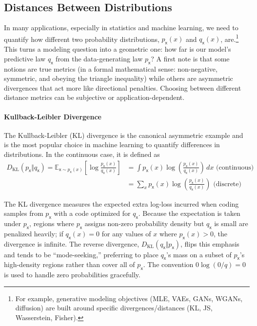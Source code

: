 \subsection{Distances Between Distributions}
In many applications, especially in statistics and machine learning, we need to quantify how different two probability distributions, $p_{\mathsf{x}}(x)$ and $q_{\mathsf{x}}(x)$, are.\footnote{For example, generative modeling objectives (MLE, VAEs, GANs, WGANs, diffusion) are built around specific divergences/distances (KL, JS, Wasserstein, Fisher).} This turns a modeling question into a geometric one: how far is our model's predictive law $q_{\mathsf{x}}$ from the data-generating law $p_{\mathsf{x}}$? A first note is that some notions are true metrics (in a formal mathematical sense: non-negative, symmetric, and obeying the triangle inequality) while others are asymmetric divergences that act more like directional penalties. Choosing between different distance metrics can be subjective or application-dependent.

\paragraph*{Kullback-Leibler Divergence} The Kullback-Leibler (KL) divergence  is the canonical asymmetric example and is the most popular choice in machine learning to quantify differences in distributions. In the continuous case, it is defined as
\begin{align}
    D_{\mathrm{KL}}(p_{\mathsf{x}}\Vert q_{\mathsf{x}})= \mathbb{E}_{\mathsf{x} \sim p_{\mathsf{x}}(x)}\left[ \log\frac{p_{\mathsf{x}}(x)}{q_{\mathsf{x}}(x)} \right] &=  \int p_{\mathsf{x}}(x)\log\!\left(\frac{p_{\mathsf{x}}(x)}{q_{\mathsf{x}}(x)}\right)\,dx \text{ (continuous)} \\
    &=  \sum_x p_{\mathsf{x}}(x)\log\!\left(\frac{p_{\mathsf{x}}(x)}{q_{\mathsf{x}}(x)}\right) \text{ (discrete)}
\end{align}

The KL divergence measures the expected extra log-loss incurred when coding samples from $p_{\mathsf{x}}$ with a code optimized for $q_{\mathsf{x}}$. Because the expectation is taken under $p_{\mathsf{x}}$, regions where $p_{\mathsf{x}}$ assigns non-zero probability density but $q_{\mathsf{x}}$ is small are penalized heavily; if $q_{\mathsf{x}}(x)=0$ for any values of $x$ where $p_{\mathsf{x}}(x)>0$, the divergence is infinite. The reverse divergence, $D_{\mathrm{KL}}(q_{\mathsf{x}}\Vert p_{\mathsf{x}})$, flips this emphasis and tends to be “mode-seeking,” preferring to place $q_{\mathsf{x}}$'s mass on a subset of $p_{\mathsf{x}}$'s high-density regions rather than cover all of $p_{\mathsf{x}}$. The convention $0\log(0/q)=0$ is used to handle zero probabilities gracefully.


